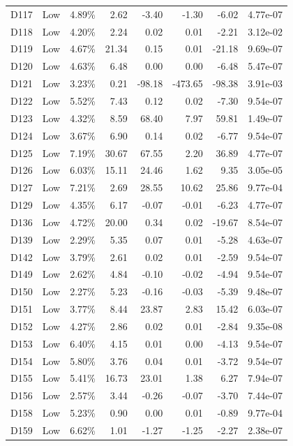 \begin{tabular}{l l r r r r r r}
D117 & Low & 4.89\% & 2.62 & -3.40 & -1.30 & -6.02 & 4.77e-07 \\
D118 & Low & 4.20\% & 2.24 & 0.02 & 0.01 & -2.21 & 3.12e-02 \\
D119 & Low & 4.67\% & 21.34 & 0.15 & 0.01 & -21.18 & 9.69e-07 \\
D120 & Low & 4.63\% & 6.48 & 0.00 & 0.00 & -6.48 & 5.47e-07 \\
D121 & Low & 3.23\% & 0.21 & -98.18 & -473.65 & -98.38 & 3.91e-03 \\
D122 & Low & 5.52\% & 7.43 & 0.12 & 0.02 & -7.30 & 9.54e-07 \\
D123 & Low & 4.32\% & 8.59 & 68.40 & 7.97 & 59.81 & 1.49e-07 \\
D124 & Low & 3.67\% & 6.90 & 0.14 & 0.02 & -6.77 & 9.54e-07 \\
D125 & Low & 7.19\% & 30.67 & 67.55 & 2.20 & 36.89 & 4.77e-07 \\
D126 & Low & 6.03\% & 15.11 & 24.46 & 1.62 & 9.35 & 3.05e-05 \\
D127 & Low & 7.21\% & 2.69 & 28.55 & 10.62 & 25.86 & 9.77e-04 \\
D129 & Low & 4.35\% & 6.17 & -0.07 & -0.01 & -6.23 & 4.77e-07 \\
D136 & Low & 4.72\% & 20.00 & 0.34 & 0.02 & -19.67 & 8.54e-07 \\
D139 & Low & 2.29\% & 5.35 & 0.07 & 0.01 & -5.28 & 4.63e-07 \\
D142 & Low & 3.79\% & 2.61 & 0.02 & 0.01 & -2.59 & 9.54e-07 \\
D149 & Low & 2.62\% & 4.84 & -0.10 & -0.02 & -4.94 & 9.54e-07 \\
D150 & Low & 2.27\% & 5.23 & -0.16 & -0.03 & -5.39 & 9.48e-07 \\
D151 & Low & 3.77\% & 8.44 & 23.87 & 2.83 & 15.42 & 6.03e-07 \\
D152 & Low & 4.27\% & 2.86 & 0.02 & 0.01 & -2.84 & 9.35e-08 \\
D153 & Low & 6.40\% & 4.15 & 0.01 & 0.00 & -4.13 & 9.54e-07 \\
D154 & Low & 5.80\% & 3.76 & 0.04 & 0.01 & -3.72 & 9.54e-07 \\
D155 & Low & 5.41\% & 16.73 & 23.01 & 1.38 & 6.27 & 7.94e-07 \\
D156 & Low & 2.57\% & 3.44 & -0.26 & -0.07 & -3.70 & 7.44e-07 \\
D158 & Low & 5.23\% & 0.90 & 0.00 & 0.01 & -0.89 & 9.77e-04 \\
D159 & Low & 6.62\% & 1.01 & -1.27 & -1.25 & -2.27 & 2.38e-07 \\

\end{tabular}
